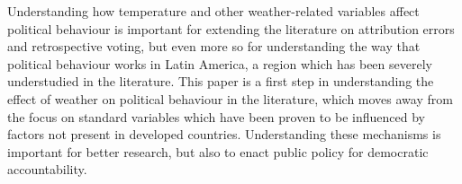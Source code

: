 \documentclass[
  12pt,
  letterpaper,
  DIV=11,
  numbers=noendperiod]{scrartcl}
\begin{document}
Understanding how temperature and other weather-related variables affect
political behaviour is important for extending the literature on
attribution errors and retrospective voting, but even more so for
understanding the way that political behaviour works in Latin America, a
region which has been severely understudied in the literature. This
paper is a first step in understanding the effect of weather on
political behaviour in the literature, which moves away from the focus
on standard variables which have been proven to be influenced by factors
not present in developed countries. Understanding these mechanisms is
important for better research, but also to enact public policy for
democratic accountability.
\end{document}
